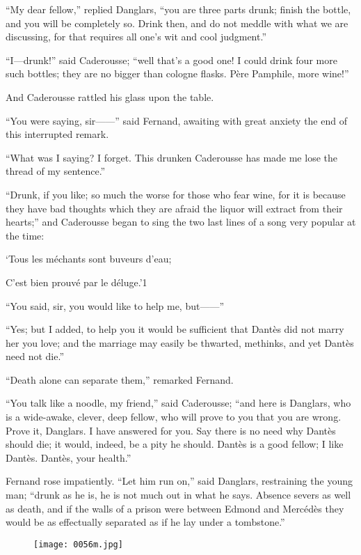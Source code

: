 “My dear fellow,” replied Danglars, “you are three parts drunk; finish
the bottle, and you will be completely so. Drink then, and do not
meddle with what we are discussing, for that requires all one’s wit and
cool judgment.”

“I—drunk!” said Caderousse; “well that’s a good one! I could drink four
more such bottles; they are no bigger than cologne flasks. Père
Pamphile, more wine!”

And Caderousse rattled his glass upon the table.

“You were saying, sir——” said Fernand, awaiting with great anxiety the
end of this interrupted remark.

“What was I saying? I forget. This drunken Caderousse has made me lose
the thread of my sentence.”

“Drunk, if you like; so much the worse for those who fear wine, for it
is because they have bad thoughts which they are afraid the liquor will
extract from their hearts;” and Caderousse began to sing the two last
lines of a song very popular at the time:

‘Tous les méchants sont buveurs d’eau;

C’est bien prouvé par le déluge.’1


“You said, sir, you would like to help me, but——”

“Yes; but I added, to help you it would be sufficient that Dantès did
not marry her you love; and the marriage may easily be thwarted,
methinks, and yet Dantès need not die.”

“Death alone can separate them,” remarked Fernand.

“You talk like a noodle, my friend,” said Caderousse; “and here is
Danglars, who is a wide-awake, clever, deep fellow, who will prove to
you that you are wrong. Prove it, Danglars. I have answered for you.
Say there is no need why Dantès should die; it would, indeed, be a pity
he should. Dantès is a good fellow; I like Dantès. Dantès, your
health.”

Fernand rose impatiently. “Let him run on,” said Danglars, restraining
the young man; “drunk as he is, he is not much out in what he says.
Absence severs as well as death, and if the walls of a prison were
between Edmond and Mercédès they would be as effectually separated as
if he lay under a tombstone.”

\begin{figure}[h]
\texttt{[image: 0056m.jpg]}
\end{figure}

